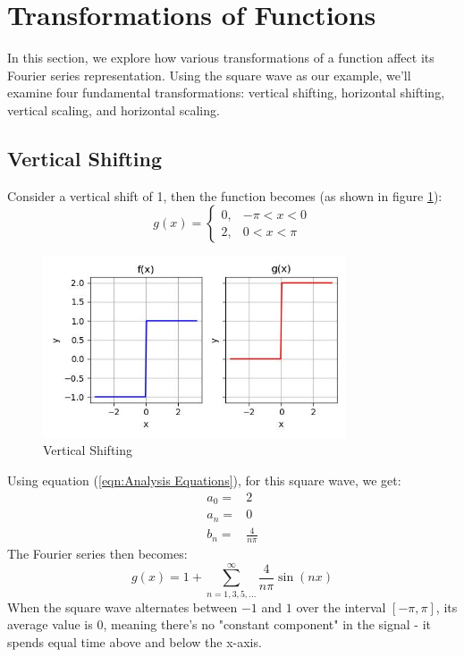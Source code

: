 \documentclass{article}
\begin{document}
\section{Transformations of Functions}

In this section, we explore how various transformations of a function affect its Fourier series representation. Using the square wave as our example, we'll examine four fundamental transformations: vertical shifting, horizontal shifting, vertical scaling, and horizontal scaling.

\subsection{Vertical Shifting}   
Consider a vertical shift of 1, then the function becomes (as shown in figure \ref{vertical shifting}):
\begin{equation}
g(x) = 
\begin{cases} 
0, & -\pi < x < 0 \\
2, & 0 < x < \pi
\end{cases}
\end{equation}

\begin{figure}[t]
    \centering
    \includegraphics[width=0.8\textwidth]{vertical_shift.jpg}
    \caption{Vertical Shifting}
    \label{vertical shifting}
\end{figure}
Using equation (\ref{eqn:Analysis Equations}), for this square wave, we get:
    \begin{eqnarray}
    a_0 =& 2\nonumber\\
    a_n =& 0\\
    b_n =& \frac{4}{n\pi} \nonumber
    \end{eqnarray}
The Fourier series then becomes:
    \begin{equation}
g(x) = 1 + \sum_{n=1,3,5,...}^{\infty} \frac{4}{n\pi} \sin\left(nx\right)
    \end{equation}
When the square wave alternates between $-1$ and $1$ over the interval $[-\pi, \pi]$, its average value is $0$, meaning there's no "constant component" in the signal - it spends equal time above and below the x-axis.
\vspace{0.2in}
\end{document}
